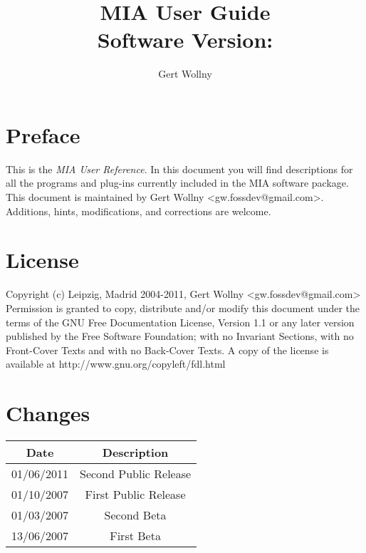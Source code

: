 \documentclass[english, 10pt, a4paper,headsepline,openany]{scrbook}
\begin{document}
\vfill{}
\title{MIA User Guide \\Software Version: \miaversion}
\vfill{}


\author{Gert Wollny}

\maketitle

\section*{Preface}

This is the \emph{MIA User Reference}. 
In this document you will find descriptions for all the programs and plug-ins currently included in the 
  MIA software package. 
This document is maintained by Gert Wollny <gw.fossdev@gmail.com>. 
Additions, hints, modifications, and corrections are welcome. 

\section*{License}

Copyright (c) Leipzig, Madrid 2004-2011, Gert Wollny <gw.fossdev@gmail.com>
Permission is granted to copy, distribute and/or modify this document under the terms of the 
  GNU Free Documentation License, Version 1.1 or any later version published by the 
  Free Software Foundation; with no Invariant Sections, 
  with no Front-Cover Texts and with no Back-Cover Texts. 
A copy of the license is available at http://www.gnu.org/copyleft/fdl.html

\section*{Changes}

\begin{center}
\begin{tabular}{cc}
\hline 
Date  & Description\\
\hline
\hline 
01/06/2011 & Second Public Release  \\
01/10/2007 & First Public Release  \\
01/03/2007 & Second Beta \\
13/06/2007 & First Beta  \\
\hline
\end{tabular}
\end{center}

\tableofcontents{}
\end{document}
